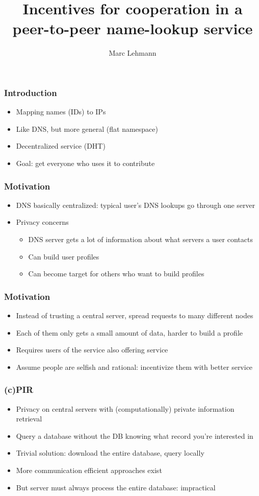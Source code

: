 \documentclass{beamer}
\title{Incentives for cooperation in a peer-to-peer name-lookup service}
\author{Marc Lehmann}
\date{}
\begin{document}
\frame{\titlepage}

\begin{frame}
  \frametitle{Introduction}
  \begin{itemize}
    \item Mapping names (IDs) to IPs
    \item Like DNS, but more general (flat namespace)
    \item Decentralized service (DHT)
    \item Goal: get everyone who uses it to contribute
  \end{itemize}
\end{frame}

\begin{frame}
  \frametitle{Motivation}
  \begin{itemize}
    \item DNS basically centralized: typical user's DNS lookups go through one
          server
    \item Privacy concerns
    \begin{itemize}
      \item DNS server gets a lot of information about what servers a user
            contacts
      \item Can build user profiles
      \item Can become target for others who want to build profiles
    \end{itemize}
  \end{itemize}
\end{frame}

\begin{frame}
  \frametitle{Motivation}
  \begin{itemize}
    \item Instead of trusting a central server, spread requests to many
          different nodes
    \item Each of them only gets a small amount of data, harder to build a
          profile
    \item Requires users of the service also offering service
    \item Assume people are selfish and rational: incentivize them with better
          service
  \end{itemize}
\end{frame}

\begin{frame}
  \frametitle{(c)PIR}
  \begin{itemize}
    \item Privacy on central servers with (computationally) private information
          retrieval
    \item Query a database without the DB knowing what record you're interested
          in
    \item Trivial solution: download the entire database, query locally
    \item More communication efficient approaches exist
    \item But server must always process the entire database: impractical
  \end{itemize}
\end{frame}
\end{document}

